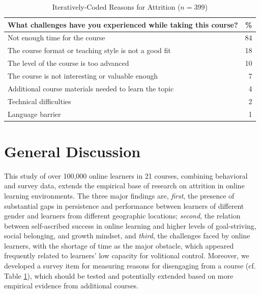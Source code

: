 \documentclass{sigchi}\usepackage[]{graphicx}\usepackage[]{color}
\begin{document}
\begin{table}
\caption{Iteratively-Coded Reasons for Attrition ($n=399$)}
\label{tab:s2reas}
\small
\center
\begin{tabular}{lr}
\toprule
What challenges have you experienced while taking this course?  & \% \\
\midrule
Not enough time for the course & 84 \\
The course format or teaching style is not a good fit & 18 \\
The level of the course is too advanced & 10 \\
The course is not interesting or valuable enough & 7 \\
Additional course materials needed to learn the topic & 4 \\
Technical difficulties & 2 \\
Language barrier & 1 \\
\bottomrule
\end{tabular}
\end{table}

\section{General Discussion}

This study of over 100,000 online learners in 21 courses, combining behavioral and survey data, extends the empirical base of research on attrition in online learning environments. The three major findings are, \emph{first}, the presence of substantial gaps in persistence and performance between learners of different gender and learners from different geographic locations; \emph{second}, the relation between self-ascribed success in online learning and higher levels of goal-striving, social belonging, and growth mindset, and \emph{third}, the challenges faced by online learners, with the shortage of time as the major obstacle, which appeared frequently related to learners' low capacity for volitional control. Moreover, we developed a survey item for measuring reasons for disengaging from a course (cf. Table \ref{tab:s2reas}), which should be tested and potentially extended based on more empirical evidence from additional courses.
\end{document}
